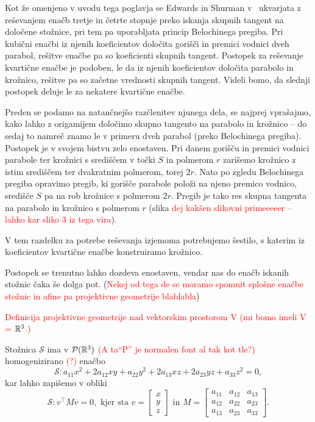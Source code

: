Kot že omenjeno v uvodu tega poglavja se Edwards in Shurman v~\cite{edwards2001} ukvarjata z reševanjem enačb tretje in četrte stopnje preko iskanja skupnih tangent na določene stožnice, pri tem pa uporabljata princip Belochinega pregiba. Pri kubični enačbi iz njenih koeficientov določita gorišči in premici vodnici dveh parabol, rešitve enačbe pa so koeficienti skupnih tangent. Postopek za reševanje kvartične enačbe je podoben, le da iz njenih koeficientov določita parabolo in krožnico, rešitve pa so začetne vrednosti skupnih tangent. Videli bomo, da slednji postopek deluje le za nekatere kvartične enačbe.

Preden se podamo na natančnejšo razčlenitev njunega dela, se najprej vprašajmo, kako lahko z origamijem določimo skupno tangento na parabolo in krožnico -- do sedaj to namreč znamo le v primeru dveh parabol (preko Belochinega pregiba). Postopek je v svojem bistvu zelo enostaven. Pri danem gorišču in premici vodnici parabole ter krožnici s središčem v točki $S$ in polmerom $r$ zarišemo krožnico z istim središčem ter dvakratnim polmerom, torej $2r$. Nato po zgledu Belochinega pregiba opravimo pregib, ki gorišče parabole položi na njeno premico vodnico, središče $S$ pa na rob krožnice s polmerom $2r$. Pregib je tako res skupna tangenta na parabolo in krožnico s polmerom $r$ (slika \textcolor{red}{dej kakšen slikovni primeeeeer -- lahko kar sliko 3 iz tega vira}).

\begin{opomba}
    V tem razdelku za potrebe reševanja izjemoma potrebujemo šestilo, s katerim iz koeficientov kvartične enačbe konstruiramo krožnico.
\end{opomba}

Postopek se trenutno lahko dozdeva enostaven, vendar nas do enačb iskanih stožnic čaka še dolga pot. (\textcolor{red}{Nekej od tega de se moramo spomnit splošne enačbe stožnic in afine pa projektivne geometrije blablabla})

\textcolor{red}{Definicija projektivne geometrije nad vektorskim prostorom V (mi bomo imeli V = $\mathbb R^3$.)}

Stožnica $\mathcal{S}$ ima v $\mathcal{P}(\mathbb R^3)$ \textcolor{red}{(A ta``P'' je normalen font al tak kot tle?)} homogenizirano \textcolor{red}{(?)} enačbo
\begin{equation}
    \label{en:stoznica_splosna}
    \mathcal{S}: a_{11}x^2 + 2a_{12}xy + a_{22}y^2 + 2a_{13}xz + 2a_{23}yz + a_{33}z^2 = 0,
\end{equation}
kar lahko zapišemo v obliki
\begin{equation*}
    \mathcal{S}: v^\intercal M v = 0,
    \text{ kjer sta } v =
    \begin{bmatrix}
        x\\
        y\\
        z
    \end{bmatrix}
    \text{ in } M =
    \begin{bmatrix}
        a_{11} & a_{12} & a_{13}\\
        a_{12} & a_{22} & a_{23}\\
        a_{13} & a_{23} & a_{33}
    \end{bmatrix}.
\end{equation*}

